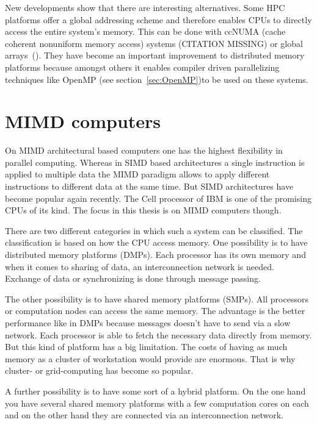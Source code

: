 New developments show that there are interesting alternatives. Some
HPC platforms offer a global addressing scheme and therefore enables
CPUs to directly access the entire system's memory. This can be done
with ccNUMA (cache coherent nonuniform memory access) systems
(CITATION MISSING) or
global arrays~(\cite{nieplocha96gan}). %
They have become an important improvement to distributed memory
platforms because amongst others it enables compiler driven
parallelizing techniques like OpenMP (see section~\ref{sec:OpenMP})to be
used on these systems. 

\section{MIMD computers}
\label{sec:mimd_computers}

On MIMD architectural based computers one has the highest flexibility
in parallel computing. Whereas in SIMD based architectures a single
instruction is applied to multiple data the MIMD paradigm allows to
apply different instructions to different data at the same time. But
SIMD architectures have become popular again recently. The Cell
processor of IBM is one of the promising CPUs of its kind. The focus in
this thesis is on MIMD computers though.

There are two different categories in which such a system can be
classified. The classification is based on how the CPU access
memory. One possibility is to have distributed memory platforms (DMPs). Each
processor has its own memory and when it comes to sharing of data, an
interconnection network is needed. Exchange of data or synchronizing
is done through message passing.

The other possibility is to have shared memory platforms (SMPs). All
processors or computation nodes can access the same memory. The
advantage is the better performance like in DMPs because messages doesn't
have to send via a slow network. Each processor is able to
fetch the necessary data directly from memory. But this kind of platform
has a big limitation. The costs of having as much memory as a cluster
of workstation would provide are enormous. That is why cluster- or
grid-computing has become so popular.

A further possibility is to have some sort of a hybrid platform. On
the one hand you have several shared memory platforms with a few
computation cores on each and on the other hand they are connected via
an interconnection network. 


